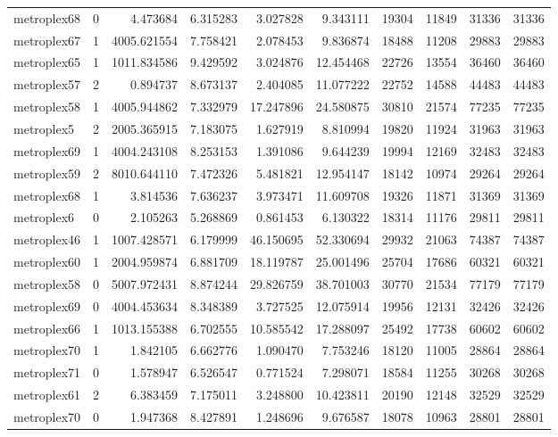 \begin{longtable}{|l|r|r|r|r|r|r|r|r|r|}
metroplex68 & 0 & 4.473684 & 6.315283 & 3.027828 & 9.343111 & 19304 & 11849 & 31336 & 31336 \\
metroplex67 & 1 & 4005.621554 & 7.758421 & 2.078453 & 9.836874 & 18488 & 11208 & 29883 & 29883 \\
metroplex65 & 1 & 1011.834586 & 9.429592 & 3.024876 & 12.454468 & 22726 & 13554 & 36460 & 36460 \\
metroplex57 & 2 & 0.894737 & 8.673137 & 2.404085 & 11.077222 & 22752 & 14588 & 44483 & 44483 \\
metroplex58 & 1 & 4005.944862 & 7.332979 & 17.247896 & 24.580875 & 30810 & 21574 & 77235 & 77235 \\
metroplex5 & 2 & 2005.365915 & 7.183075 & 1.627919 & 8.810994 & 19820 & 11924 & 31963 & 31963 \\
metroplex69 & 1 & 4004.243108 & 8.253153 & 1.391086 & 9.644239 & 19994 & 12169 & 32483 & 32483 \\
metroplex59 & 2 & 8010.644110 & 7.472326 & 5.481821 & 12.954147 & 18142 & 10974 & 29264 & 29264 \\
metroplex68 & 1 & 3.814536 & 7.636237 & 3.973471 & 11.609708 & 19326 & 11871 & 31369 & 31369 \\
metroplex6 & 0 & 2.105263 & 5.268869 & 0.861453 & 6.130322 & 18314 & 11176 & 29811 & 29811 \\
metroplex46 & 1 & 1007.428571 & 6.179999 & 46.150695 & 52.330694 & 29932 & 21063 & 74387 & 74387 \\
metroplex60 & 1 & 2004.959874 & 6.881709 & 18.119787 & 25.001496 & 25704 & 17686 & 60321 & 60321 \\
metroplex58 & 0 & 5007.972431 & 8.874244 & 29.826759 & 38.701003 & 30770 & 21534 & 77179 & 77179 \\
metroplex69 & 0 & 4004.453634 & 8.348389 & 3.727525 & 12.075914 & 19956 & 12131 & 32426 & 32426 \\
metroplex66 & 1 & 1013.155388 & 6.702555 & 10.585542 & 17.288097 & 25492 & 17738 & 60602 & 60602 \\
metroplex70 & 1 & 1.842105 & 6.662776 & 1.090470 & 7.753246 & 18120 & 11005 & 28864 & 28864 \\
metroplex71 & 0 & 1.578947 & 6.526547 & 0.771524 & 7.298071 & 18584 & 11255 & 30268 & 30268 \\
metroplex61 & 2 & 6.383459 & 7.175011 & 3.248800 & 10.423811 & 20190 & 12148 & 32529 & 32529 \\
metroplex70 & 0 & 1.947368 & 8.427891 & 1.248696 & 9.676587 & 18078 & 10963 & 28801 & 28801 \\

\end{longtable}
